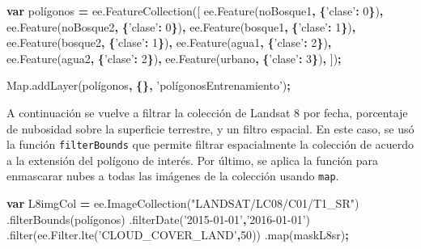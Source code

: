 \documentclass[
]{article}
\newenvironment{Shaded}{\begin{snugshade}}{\end{snugshade}}
\newcommand{\AttributeTok}[1]{\textcolor[rgb]{0.77,0.63,0.00}{#1}}
\newcommand{\DecValTok}[1]{\textcolor[rgb]{0.00,0.00,0.81}{#1}}
\newcommand{\KeywordTok}[1]{\textcolor[rgb]{0.13,0.29,0.53}{\textbf{#1}}}
\newcommand{\NormalTok}[1]{#1}
\newcommand{\OperatorTok}[1]{\textcolor[rgb]{0.81,0.36,0.00}{\textbf{#1}}}
\newcommand{\StringTok}[1]{\textcolor[rgb]{0.31,0.60,0.02}{#1}}
\newcommand{\VariableTok}[1]{\textcolor[rgb]{0.00,0.00,0.00}{#1}}
\begin{document}
\begin{Shaded}
\begin{Highlighting}[]
\KeywordTok{var}\NormalTok{ polígonos }\OperatorTok{=} \VariableTok{ee}\NormalTok{.}\AttributeTok{FeatureCollection}\NormalTok{([}
  \VariableTok{ee}\NormalTok{.}\AttributeTok{Feature}\NormalTok{(noBosque1}\OperatorTok{,} \OperatorTok{\{}\StringTok{'clase'}\OperatorTok{:} \DecValTok{0}\OperatorTok{\}}\NormalTok{)}\OperatorTok{,}
  \VariableTok{ee}\NormalTok{.}\AttributeTok{Feature}\NormalTok{(noBosque2}\OperatorTok{,} \OperatorTok{\{}\StringTok{'clase'}\OperatorTok{:} \DecValTok{0}\OperatorTok{\}}\NormalTok{)}\OperatorTok{,}
  \VariableTok{ee}\NormalTok{.}\AttributeTok{Feature}\NormalTok{(bosque1}\OperatorTok{,} \OperatorTok{\{}\StringTok{'clase'}\OperatorTok{:} \DecValTok{1}\OperatorTok{\}}\NormalTok{)}\OperatorTok{,}
  \VariableTok{ee}\NormalTok{.}\AttributeTok{Feature}\NormalTok{(bosque2}\OperatorTok{,} \OperatorTok{\{}\StringTok{'clase'}\OperatorTok{:} \DecValTok{1}\OperatorTok{\}}\NormalTok{)}\OperatorTok{,}
  \VariableTok{ee}\NormalTok{.}\AttributeTok{Feature}\NormalTok{(agua1}\OperatorTok{,} \OperatorTok{\{}\StringTok{'clase'}\OperatorTok{:} \DecValTok{2}\OperatorTok{\}}\NormalTok{)}\OperatorTok{,}
  \VariableTok{ee}\NormalTok{.}\AttributeTok{Feature}\NormalTok{(agua2}\OperatorTok{,} \OperatorTok{\{}\StringTok{'clase'}\OperatorTok{:} \DecValTok{2}\OperatorTok{\}}\NormalTok{)}\OperatorTok{,}
  \VariableTok{ee}\NormalTok{.}\AttributeTok{Feature}\NormalTok{(urbano}\OperatorTok{,} \OperatorTok{\{}\StringTok{'clase'}\OperatorTok{:} \DecValTok{3}\OperatorTok{\}}\NormalTok{)}\OperatorTok{,}
\NormalTok{])}\OperatorTok{;}

\VariableTok{Map}\NormalTok{.}\AttributeTok{addLayer}\NormalTok{(polígonos}\OperatorTok{,} \OperatorTok{\{\},} \StringTok{'polígonosEntrenamiento'}\NormalTok{)}\OperatorTok{;}
\end{Highlighting}
\end{Shaded}

A continuación se vuelve a filtrar la colección de Landsat 8 por fecha,
porcentaje de nubosidad sobre la superficie terrestre, y un filtro
espacial. En este caso, se usó la función \texttt{filterBounds} que
permite filtrar espacialmente la colección de acuerdo a la extensión del
polígono de interés. Por último, se aplica la función para enmascarar
nubes a todas las imágenes de la colección usando \texttt{map}.

\begin{Shaded}
\begin{Highlighting}[]
\KeywordTok{var}\NormalTok{ L8imgCol }\OperatorTok{=} \VariableTok{ee}\NormalTok{.}\AttributeTok{ImageCollection}\NormalTok{(}\StringTok{"LANDSAT/LC08/C01/T1_SR"}\NormalTok{)}
\NormalTok{  .}\AttributeTok{filterBounds}\NormalTok{(polígonos)}
\NormalTok{  .}\AttributeTok{filterDate}\NormalTok{(}\StringTok{'2015-01-01'}\OperatorTok{,}\StringTok{'2016-01-01'}\NormalTok{)}
\NormalTok{  .}\AttributeTok{filter}\NormalTok{(}\VariableTok{ee}\NormalTok{.}\VariableTok{Filter}\NormalTok{.}\AttributeTok{lte}\NormalTok{(}\StringTok{'CLOUD_COVER_LAND'}\OperatorTok{,}\DecValTok{50}\NormalTok{))}
\NormalTok{  .}\AttributeTok{map}\NormalTok{(maskL8sr)}\OperatorTok{;}
\end{Highlighting}
\end{Shaded}
\end{document}
